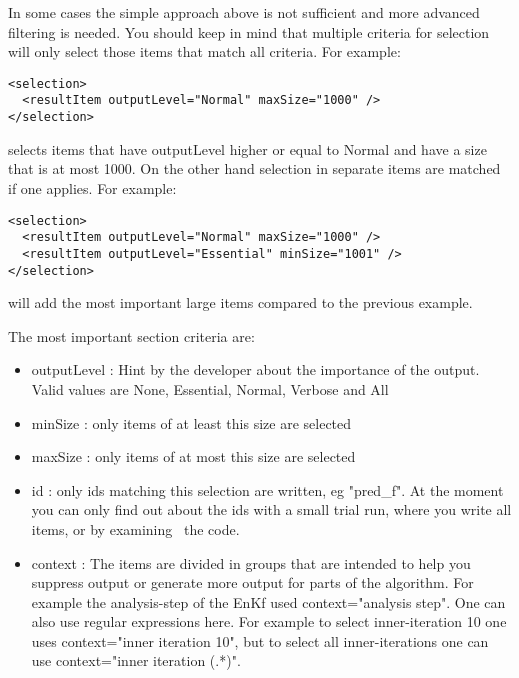 
In some cases the simple approach above is not sufficient and more advanced
filtering is needed. You should keep in mind that multiple criteria for
selection will only select those items that match all criteria. For example:
\begin{verbatim}
<selection>
  <resultItem outputLevel="Normal" maxSize="1000" />
</selection>
\end{verbatim}
selects items that have outputLevel higher or equal to Normal and have a size
that is at most 1000. On the other hand selection in separate items are matched
if one applies. For example:
\begin{verbatim}
<selection>
  <resultItem outputLevel="Normal" maxSize="1000" />
  <resultItem outputLevel="Essential" minSize="1001" />
</selection>
\end{verbatim}
will add the most important large items compared to the previous example.

The most important section criteria are:
\begin{itemize}
\item outputLevel : Hint by the developer about the importance of the output.
Valid values are None, Essential, Normal, Verbose and All
\item minSize : only items of at least this size are selected
\item maxSize : only items of at most this size are selected
\item id : only ids matching this selection are written, eg "pred\_f". At the
moment you can only find out about the ids with a small trial run, where you
write all items, or by examining  the code.
\item context : The items are divided in groups that are intended to help you
suppress output or generate more output for parts of the algorithm. For example
the analysis-step of the EnKf used context="analysis step". One can also use
regular expressions here. For example to select inner-iteration 10 one uses
context="inner iteration 10", but to select all inner-iterations one can use
context="inner iteration (.*)".
\end{itemize}


